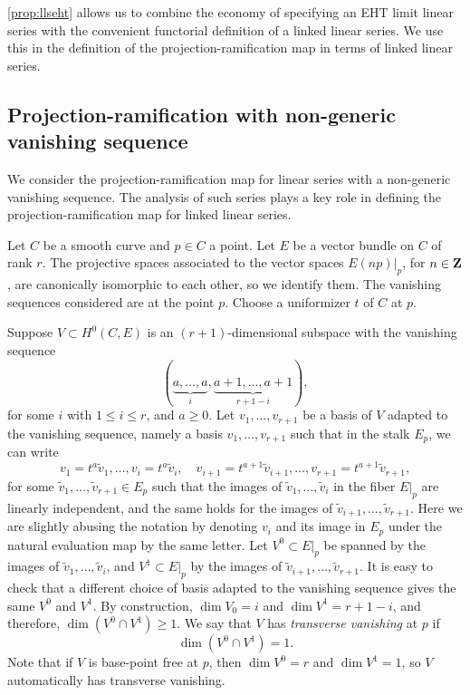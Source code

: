 \documentclass[11pt,reqno]{amsart}
\theoremstyle{plain}
\theoremstyle{definition}
\theoremstyle{remark}
\numberwithin{equation}{section}
\numberwithin{equation}{section}
\begin{document}
\autoref{prop:llseht} allows us to combine the economy of specifying an EHT limit linear series with the convenient functorial definition of a linked linear series.
We use this in the definition of the projection-ramification map in terms of linked linear series.

\subsection{Projection-ramification with non-generic vanishing sequence}
\label{sec:prnongeneric}
We consider the projection-ramification map for linear series with a non-generic vanishing sequence.
The analysis of such series plays a key role in defining the projection-ramification map for linked linear series.

Let $C$ be a smooth curve and $p \in C$ a point.
Let $E$ be a vector bundle on $C$ of rank $r$.
The projective spaces associated to the vector spaces $E(np)|_p$, for $n \in {\bf Z}$, are canonically isomorphic to each other, so we identify them.
The vanishing sequences considered are at the point $p$.
Choose a uniformizer $t$ of $C$ at $p$.

Suppose $V \subset H^0(C, E)$ is an $(r+1)$-dimensional subspace with the vanishing sequence 
\begin{equation}\label{eqn:specialvs}
  (\underbrace{a, \dots, a}_{i}, \underbrace{a+1, \dots, a+1}_{r+1-i}),
\end{equation}
for some $i$ with $1 \leq i \leq r$, and $a \geq 0$.
Let $v_1, \dots, v_{r+1}$ be a basis of $V$ adapted to the vanishing sequence, namely a basis $v_1, \dots, v_{r+1}$ such that in the stalk $E_p$, we can write
\begin{equation}\label{eqn:basis}
  v_1 = t^a \widetilde v_1, \dots, v_{i} = t^a \widetilde v_i,\quad v_{i+1} = t^{a+1} \widetilde v_{i+1}, \dots, v_{r+1} = t^{a+1} \widetilde v_{r+1},
\end{equation}
for some $\widetilde v_1, \dots, \widetilde v_{r+1} \in E_p$ such that the images of $\widetilde v_1, \dots, \widetilde v_i$ in the fiber $E|_p$ are linearly independent, and the same holds for the images of $\widetilde v_{i+1}, \dots, \widetilde v_{r+1}$.
Here we are slightly abusing the notation by denoting $v_i$ and its image in $E_p$ under the natural evaluation map by the same letter.
Let $V^0 \subset E|_p$ be spanned by the images of $\widetilde v_1, \dots, \widetilde v_i$, and $V^1 \subset E|_p$ by the images of $\widetilde v_{i+1}, \dots, \widetilde v_{r+1}$.
It is easy to check that a different choice of basis adapted to the vanishing sequence gives the same $V^0$ and $V^1$.
By construction, $\dim V_0 = i$ and $\dim V^1 = r+1-i$, and therefore, $\dim (V^0 \cap V^1) \geq 1$.
We say that $V$ has \emph{transverse vanishing} at $p$ if 
\begin{equation}\label{eq:genericity}
  \dim (V^0 \cap V^1) = 1.
\end{equation}
Note that if $V$ is base-point free at $p$, then $\dim V^0 = r$ and $\dim V^1 = 1$, so $V$ automatically has transverse vanishing.
\end{document}
